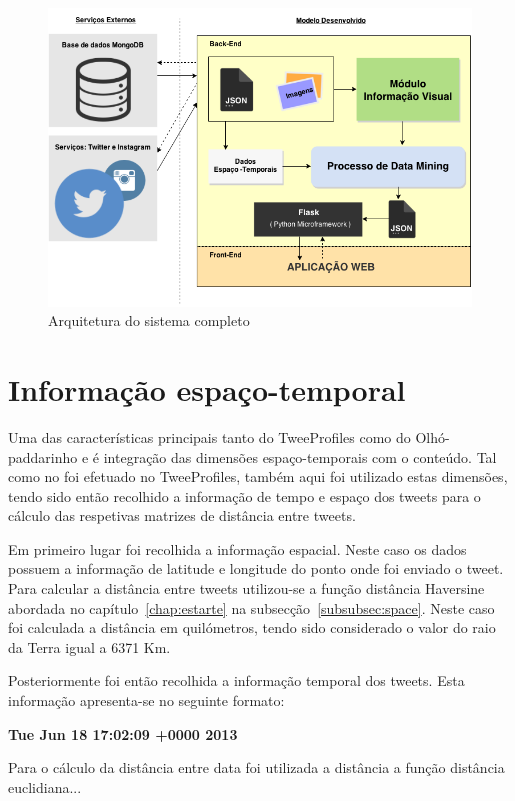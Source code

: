 \begin{figure}[h]
\centering
\includegraphics[width=1.0\linewidth]{./figures/arquitetura_sistema}
\caption{Arquitetura do sistema completo}
\label{fig:archsys}
\end{figure}


\section{Informação espaço-temporal} \label{sec:infoesptmp}

Uma das características principais tanto do TweeProfiles como do Olhó-paddarinho e é integração das dimensões espaço-temporais com o conteúdo. Tal como no foi efetuado no TweeProfiles, também aqui foi utilizado estas dimensões, tendo sido então recolhido a informação de tempo e espaço dos tweets para o cálculo das respetivas matrizes de distância entre tweets.

Em primeiro lugar foi recolhida a informação espacial. Neste caso os dados possuem a informação de latitude e longitude do ponto onde foi enviado o tweet. Para calcular a distância entre tweets utilizou-se a função distância Haversine abordada no capítulo~\ref{chap:estarte} na subsecção~\ref{subsubsec:space}. Neste caso foi calculada a distância em quilómetros, tendo sido considerado o valor do raio da Terra igual a 6371 Km.

Posteriormente foi então recolhida a informação temporal dos tweets. Esta informação apresenta-se no seguinte formato:

\vspace{2mm}
\centering\textbf{Tue Jun 18 17:02:09 +0000 2013}

Para o cálculo da distância entre data foi utilizada a distância a função distância euclidiana...




